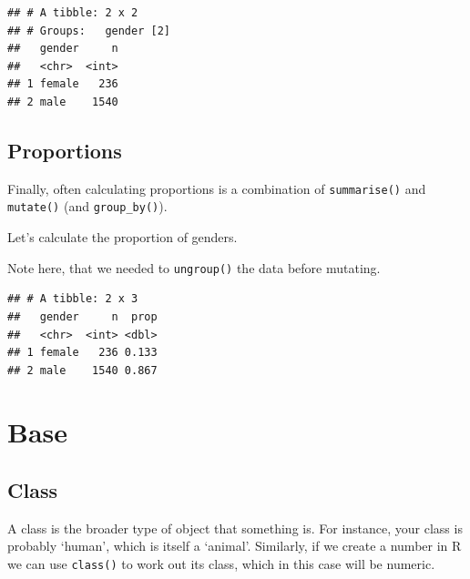 \documentclass[
]{book}
\newenvironment{Shaded}{\begin{snugshade}}{\end{snugshade}}
\newcommand{\DataTypeTok}[1]{\textcolor[rgb]{0.13,0.29,0.53}{#1}}
\newcommand{\KeywordTok}[1]{\textcolor[rgb]{0.13,0.29,0.53}{\textbf{#1}}}
\newcommand{\NormalTok}[1]{#1}
\newcommand{\OperatorTok}[1]{\textcolor[rgb]{0.81,0.36,0.00}{\textbf{#1}}}
\newcommand{\StringTok}[1]{\textcolor[rgb]{0.31,0.60,0.02}{#1}}
\begin{document}
\begin{verbatim}
## # A tibble: 2 x 2
## # Groups:   gender [2]
##   gender     n
##   <chr>  <int>
## 1 female   236
## 2 male    1540
\end{verbatim}

\hypertarget{proportions}{%
\subsection{Proportions}\label{proportions}}

Finally, often calculating proportions is a combination of \texttt{summarise()} and \texttt{mutate()} (and \texttt{group\_by()}).

Let's calculate the proportion of genders.

Note here, that we needed to \texttt{ungroup()} the data before mutating.

\begin{Shaded}
\end{Shaded}

\begin{verbatim}
## # A tibble: 2 x 3
##   gender     n  prop
##   <chr>  <int> <dbl>
## 1 female   236 0.133
## 2 male    1540 0.867
\end{verbatim}

\hypertarget{base}{%
\section{Base}\label{base}}

\hypertarget{class}{%
\subsection{Class}\label{class}}

A class is the broader type of object that something is. For instance, your class is probably `human', which is itself a `animal'. Similarly, if we create a number in R we can use \texttt{class()} to work out its class, which in this case will be numeric.
\end{document}
